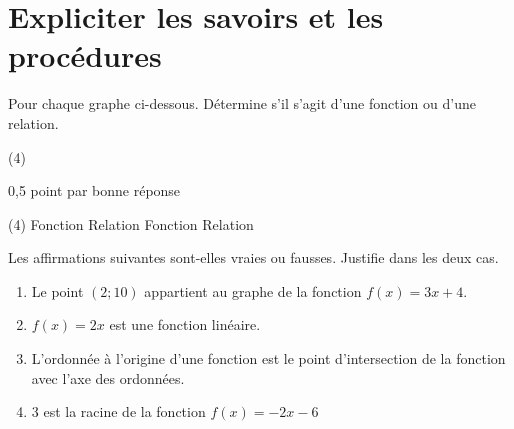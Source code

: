 \documentclass[a4paper, 12pt, parskip=half-]{scrartcl}
\begin{document}
\section*{ Expliciter les savoirs et les procédures}
\begin{exercise}[points=2]
    Pour chaque graphe ci-dessous. Détermine s'il s'agit d'une fonction ou d'une relation.
    \begin{tasks}(4)
        \task 
        \task 
        \task 
        \task 
    \end{tasks}
\end{exercise}
\begin{solution}
    0,5 point par bonne réponse
    \begin{tasks}(4)
        \task Fonction
        \task Relation
        \task Fonction
        \task Relation
    \end{tasks}
\end{solution}
\begin{exercise}[points=4]
    Les affirmations suivantes sont-elles vraies ou fausses. Justifie dans les deux cas.
    \begin{enumerate}[itemsep=1em]
        \item Le point $(2;10)$ appartient au graphe de la fonction $f(x)=3x+4$.
        \item $f(x) = 2x$ est une fonction linéaire.
        \item L'ordonnée à l'origine d'une fonction est le point d'intersection de la fonction avec l'axe des ordonnées.
        \item $3$ est la racine de la fonction $f(x)=-2x-6$
    \end{enumerate}
    \vspace*{1em}
\end{exercise}
\end{document}

